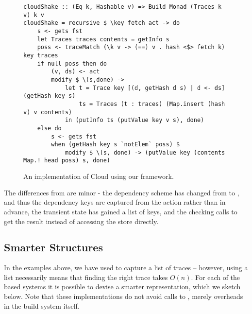 \begin{figure}
\begin{verbatim}
cloudShake :: (Eq k, Hashable v) => Build Monad (Traces k v) k v
cloudShake = recursive $ \key fetch act -> do
    s <- gets fst
    let Traces traces contents = getInfo s
    poss <- traceMatch (\k v -> (==) v . hash <$> fetch k) key traces
    if null poss then do
        (v, ds) <- act
        modify $ \(s,done) ->
            let t = Trace key [(d, getHash d s) | d <- ds] (getHash key s)
                ts = Traces (t : traces) (Map.insert (hash v) v contents)
            in (putInfo ts (putValue key v s), done)
    else do
        s <- gets fst
        when (getHash key s `notElem` poss) $
            modify $ \(s, done) -> (putValue key (contents Map.! head poss) s, done)
\end{verbatim}
\vspace{-2mm}
\caption{An implementation of Cloud \Shake using our framework.}\label{fig-cloudshake-implementation}
\vspace{-2mm}
\end{figure}

The differences from  are minor - the dependency scheme has changed from  to , and thus the dependency keys  are captured from the action rather than in advance, the transient state has gained a list of keys, and the checking calls  to get the result instead of accessing the store directly.

\subsection{Smarter \hs{[Trace]} Structures}\label{sec-smart-traces}

In the examples above, we have used \hs{[Trace k v]} to capture a list of traces -- however, using a list necessarily means that finding the right trace takes $O(n)$. For each of the  based systems it is possible to devise a smarter representation, which we sketch below. Note that these implementations do not avoid calls to , merely overheads in the build system itself.

